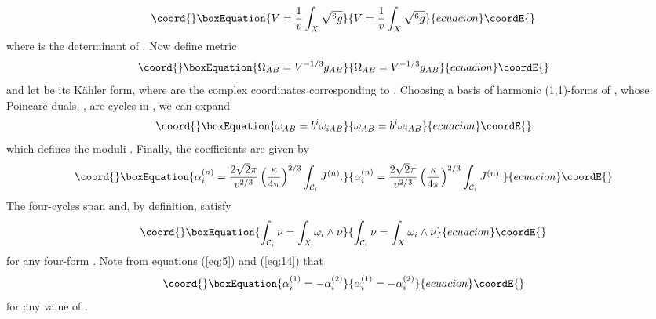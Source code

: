 \documentclass[a4paper,12pt]{article}
\numberwithin{equation}{section}
\theoremstyle{plain}
\begin{document}
%
\begin{equation}\coord{}\boxEquation{
V=\frac{1}{v}\int_{X}{\sqrt{^{6}g}}
\label{eq:11}
}{
V=\frac{1}{v}\int_{X}{\sqrt{^{6}g}}
}{ecuacion}\coordE{}\end{equation}
%
where \coordHE{} is the determinant of \coordHE{}. Now define metric
%
\begin{equation}\coord{}\boxEquation{
\Omega_{AB}=V^{-1/3}g_{AB}
\label{eq:12}
}{
\Omega_{AB}=V^{-1/3}g_{AB}
}{ecuacion}\coordE{}\end{equation}
%
and let \coordHE{} be its K\"{a}hler form, where
\coordHE{} are the complex coordinates corresponding to \coordHE{}.
Choosing a basis \coordHE{} of harmonic (1,1)-forms 
of \coordHE{}, whose Poincar\'e duals, \coordHE{}, 
are cycles in \coordHE{}, we can expand
%
\begin{equation}\coord{}\boxEquation{
\omega_{AB}= b^{i}\omega_{iAB}
\label{eq:13}
}{
\omega_{AB}= b^{i}\omega_{iAB}
}{ecuacion}\coordE{}\end{equation}
%
which defines the \coordHE{} moduli \coordHE{}. Finally, the coefficients
\coordHE{} are given by
%
\begin{equation}\coord{}\boxEquation{
\alpha_{i}^{(n)}=\frac{2\sqrt{2}\pi}{v^{2/3}}\left(\frac{\kappa}{4\pi}\right)^{2/3}
\int_{{\cal{C}}_{i}}{J^{(n)}}.
\label{eq:14}
}{
\alpha_{i}^{(n)}=\frac{2\sqrt{2}\pi}{v^{2/3}}\left(\frac{\kappa}{4\pi}\right)^{2/3}
\int_{{\cal{C}}_{i}}{J^{(n)}}.
}{ecuacion}\coordE{}\end{equation}
%
The \coordHE{} four-cycles \coordHE{} span 
\coordHE{} and, by definition, satisfy
%
\begin{equation}\coord{}\boxEquation{
\int_{{\cal{C}}_{i}}{\nu}=\int_{X}{\omega_{i}\wedge \nu}
\label{eq:15}
}{
\int_{{\cal{C}}_{i}}{\nu}=\int_{X}{\omega_{i}\wedge \nu}
}{ecuacion}\coordE{}\end{equation}
%
for any four-form \myHighlight{$\nu$}\coordHE{}. Note from equations (\ref{eq:5}) and (\ref{eq:14})
that
%
\begin{equation}\coord{}\boxEquation{
\alpha_{i}^{(1)}=-\alpha_{i}^{(2)}
\label{eq:16}
}{
\alpha_{i}^{(1)}=-\alpha_{i}^{(2)}
}{ecuacion}\coordE{}\end{equation}
%
for any value of \coordHE{}. 
\end{document}
